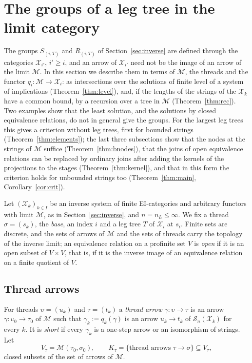 \documentclass[11pt]{amsart}
\theoremstyle{definition}
\newcommand{\cX}{\mathcal X}
\newcommand{\cM}{\mathcal M}
\newcommand{\cS}{\mathcal S}
\begin{document}
\section{The groups of a leg tree in the limit category}\label{sec:intrinsic}

The groups $S_{(i,T)}$ and $R_{(i,T)}$ of Section~\ref{sec:inverse}
are defined through the categories $\cX_{i'}$, $i'\ge i$, and an arrow
of $\cX_{i'}$ need not be the image of an arrow of the limit $\cM$. In
this section we describe them in terms of $\cM$, the threads and the
functor $q_i\colon\cM\to\cX_i$: as intersections over the solutions of
finite level of a system of implications
(Theorem~\ref{thm:level}), and, if the lengths of the strings of the
$\cX_k$ have a common bound, by a
recursion over a tree in $\cM$ (Theorem~\ref{thm:rec}). Two examples
show that the least solution, and the solutions by closed equivalence
relations, do not in general give the groups. For the largest leg trees this
gives a criterion without leg trees, first for bounded strings
(Theorem~\ref{thm:elements}); the last three subsections show that
the nodes at the strings of $\cM$ suffice
(Theorem~\ref{thm:bnodes}), that the joins of open equivalence
relations can be replaced by ordinary joins after adding the kernels
of the projections to the stages (Theorem~\ref{thm:kernel}), and that
in this form the criterion holds for unbounded strings too
(Theorem~\ref{thm:main}, Corollary~\ref{cor:crit}).

Let $(\cX_k)_{k\in I}$ be an inverse system of finite EI-categories
and arbitrary functors with limit $\cM$, as in
Section~\ref{sec:inverse}, and $n=n_L\le\infty$. We fix a thread
$\sigma=(s_k)$, the \emph{base}, an index $i$ and a leg tree $T$ of
$\cX_i$ at $s_i$. Finite sets are discrete, and the sets of arrows of
$\cM$ and the sets of threads carry the topology of the inverse
limit; an equivalence relation on a profinite set $V$ is \emph{open}
if it is an open subset of $V\times V$, that is, if it is the inverse
image of an equivalence relation on a finite quotient of $V$.

\subsection*{Thread arrows}
For threads $\upsilon=(u_k)$ and $\tau=(t_k)$ a \emph{thread arrow}
$\gamma\colon\upsilon\to\tau$ is an arrow $\gamma\colon\upsilon_0\to
\tau_0$ of $\cM$ such that $\gamma_k:=q_k(\gamma)$ is an arrow
$u_k\to t_k$ of $\cS_n(\cX_k)$ for every $k$. It is \emph{short} if
every $\gamma_k$ is a one-step arrow or an isomorphism of strings.
Let
\[
V_\tau=\cM(\tau_0,\sigma_0),\qquad K_\tau=\{\text{thread arrows }\tau
\to\sigma\}\subseteq V_\tau,
\]
closed subsets of the set of arrows of $\cM$.
\end{document}
